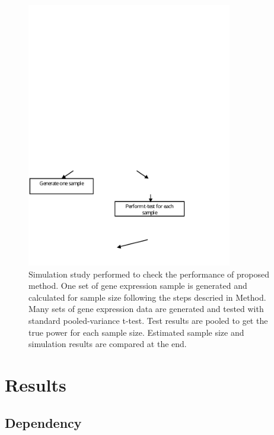\documentclass[12pt]{article}
\begin{document}
\begin{figure}%
  \caption[Flow Chart for Simulation Study]{ Simulation study
  performed to check the performance of proposed method.  One set of
  gene expression sample is generated and calculated for sample size
  following the steps descried in Method. Many sets of gene
  expression data are generated and tested with standard
  pooled-variance t-test. Test results are pooled to get
  the true power for each sample size. Estimated sample size and
  simulation results are compared at the end.}  
  \label{fig:SimuFC}
  \vspace{0.1in}
  \centerline{\includegraphics*[width=0.8\textwidth]{SimuFC.pdf}}
\end{figure}

\section{Results}

\subsection{Dependency}
\end{document}
